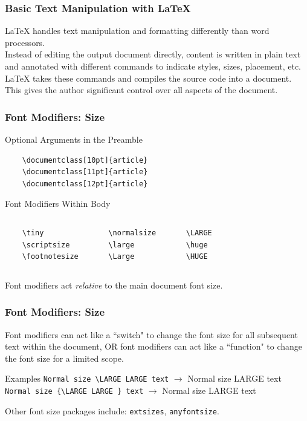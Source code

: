 \begin{frame}[fragile]
\frametitle{Basic Text Manipulation with \LaTeX{}}
    \LaTeX{} handles text manipulation and formatting differently than word processors. \\[\baselineskip] \pause
    Instead of editing the output document directly, content is written in plain text and annotated with different commands to indicate styles, sizes, placement, etc. \\[\baselineskip] \pause
    \LaTeX{} takes these commands and compiles the source code into a document. \\[\baselineskip] \pause
    This gives the author significant control over all aspects of the document. \\[\baselineskip]
\end{frame}


\begin{frame}[fragile]
\frametitle{Font Modifiers: Size}
\begin{block}{Optional Arguments in the Preamble}
    \begin{verbatim}
    \documentclass[10pt]{article}
    \documentclass[11pt]{article}
    \documentclass[12pt]{article}
    \end{verbatim}
\end{block} \pause
\begin{block}{Font Modifiers Within Body}
    \begin{columns}
    \begin{verbatim}
    \tiny
    \scriptsize
    \footnotesize
    \end{verbatim}
    \begin{verbatim}
    \normalsize
    \large
    \Large
    \end{verbatim}
    \begin{verbatim}
    \LARGE
    \huge
    \HUGE
    \end{verbatim}
    \end{columns}
\end{block} \pause
Font modifiers act \emph{relative} to the main document font size.
\end{frame}


\begin{frame}[fragile]
\frametitle{Font Modifiers: Size}
Font modifiers can act like a ``switch" to change the font size for all subsequent text within the document, OR font modifiers can act like a ``function" to change the font size for a limited scope. \pause
\begin{block}{Examples}
\footnotesize
\verb|Normal size \LARGE LARGE text| $\to$ Normal size {\Large LARGE text}  \\
\vspace{0.5cm}
\footnotesize
\verb|Normal size {\LARGE LARGE } text| $\to$ Normal size {\Large LARGE} text \\
\vspace{0.5cm}
\end{block} \pause
Other font size packages include: \verb|extsizes|, \verb|anyfontsize|.
\end{frame}


